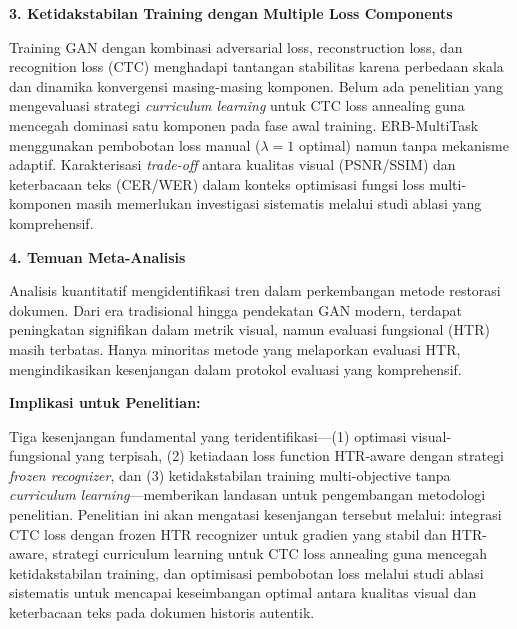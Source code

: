 \vspace{0.5em}
\noindent\textbf{3. Ketidakstabilan Training dengan Multiple Loss Components}

Training GAN dengan kombinasi adversarial loss, reconstruction loss, dan recognition loss (CTC) menghadapi tantangan stabilitas karena perbedaan skala dan dinamika konvergensi masing-masing komponen. Belum ada penelitian yang mengevaluasi strategi \textit{curriculum learning} untuk CTC loss annealing guna mencegah dominasi satu komponen pada fase awal training. ERB-MultiTask menggunakan pembobotan loss manual ($\lambda=1$ optimal) namun tanpa mekanisme adaptif. Karakterisasi \textit{trade-off} antara kualitas visual (PSNR/SSIM) dan keterbacaan teks (CER/WER) dalam konteks optimisasi fungsi loss multi-komponen masih memerlukan investigasi sistematis melalui studi ablasi yang komprehensif.

\vspace{0.5em}
\noindent\textbf{4. Temuan Meta-Analisis}

Analisis kuantitatif mengidentifikasi tren dalam perkembangan metode restorasi dokumen. Dari era tradisional hingga pendekatan GAN modern, terdapat peningkatan signifikan dalam metrik visual, namun evaluasi fungsional (HTR) masih terbatas. Hanya minoritas metode yang melaporkan evaluasi HTR, mengindikasikan kesenjangan dalam protokol evaluasi yang komprehensif.

\vspace{1ex}
\noindent\textbf{Implikasi untuk Penelitian:}

Tiga kesenjangan fundamental yang teridentifikasi—(1) optimasi visual-fungsional yang terpisah, (2) ketiadaan loss function HTR-aware dengan strategi \textit{frozen recognizer}, dan (3) ketidakstabilan training multi-objective tanpa \textit{curriculum learning}—memberikan landasan untuk pengembangan metodologi penelitian. Penelitian ini akan mengatasi kesenjangan tersebut melalui: integrasi CTC loss dengan frozen HTR recognizer untuk gradien yang stabil dan HTR-aware, strategi curriculum learning untuk CTC loss annealing guna mencegah ketidakstabilan training, dan optimisasi pembobotan loss melalui studi ablasi sistematis untuk mencapai keseimbangan optimal antara kualitas visual dan keterbacaan teks pada dokumen historis autentik.



